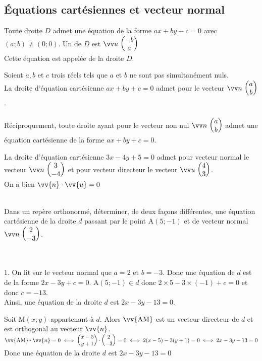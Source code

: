     \subsection{Équations cartésiennes et vecteur normal}
    
    \begin{brappel}
        Toute droite $D$ admet une équation de la forme $a x+b y+c=0$ avec $(a ; b) \neq(0 ; 0) .$ Un  de $D$ est $\Coord{u}{-b}{a}$ \\
        Cette équation est appelée  de la droite $D$.
    \end{brappel}
        
    \begin{bprop}
        Soient $a, b$ et $c$ trois réels tels que $a$ et $b$ ne sont pas simultanément nuls.\\
        La droite d'équation cartésienne $a x+b y+c=0$ admet pour  le vecteur $\Coord{n}{a}{b}$.\\
        \ \\
        Réciproquement, toute droite ayant pour  le vecteur non nul $\Coord{n}{a}{b}$ admet une équation cartésienne de la forme $a x+b y+c=0$.
    \end{bprop}
        
    \begin{bexemple}
        La droite d'équation cartésienne $3 x-4 y+5=0$ admet pour vecteur normal le vecteur $\Coord{n}{3}{-4}$  et pour vecteur directeur le vecteur $\Coord{u}{4}{3}$.\\
        On a bien $\vv{n} \cdot \vv{u}=0$
    \end{bexemple}
    
    \begin{bmethode}
        \\
        Dans un repère orthonormé, déterminer, de deux façons différentes, une équation cartésienne de la droite $d$ passant par le point $\mathrm{A}(5 ;-1)$ et de vecteur normal $\Coord{n}{2}{-3}$.
        
        \\
        \begin{enumMet}
            \item 1. On lit sur le vecteur normal que $a=2$ et $b=-3$.
            Donc une équation de $d$ est de la forme $2 x-3 y+c=0$. $\mathrm{A}(5 ;-1) \in d$ donc $2 \times 5-3 \times(-1)+c=0$ et donc $c=-13$.\\
            Ainsi, une équation de la droite $d$ est $2 x-3 y-13=0$.
            \item Soit $\mathrm{M}(x ;y)$ appartenant à $d .$ Alors $\vv{\mathrm{AM}}$ est un vecteur directeur de $d$ et est orthogonal au vecteur $\vv{n}$.\\
            $\vv{\mathrm{AM}} \cdot \vv{n}=0 \iff \CoordSV{x-5}{y+1} \cdot \CoordSV{2}{-3}=0 \iff 2(x-5)-3(y+1)=0 \iff 2 x-3 y-13=0$\\
            Donc une équation de la droite $d$ est $2 x-3 y-13=0$
        \end{enumMet}
    \end{bmethode}

